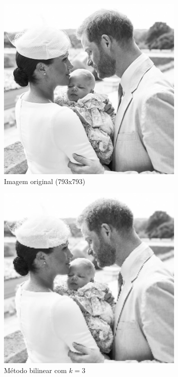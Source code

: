\documentclass[leqno]{article}
\begin{document}
\begin{figure}[H]
    \centering
    \begin{subfigure}{.33\textwidth}
      \centering
      \includegraphics[width=.7\linewidth]{../images/principe.png}
      \caption{Imagem original (793x793) }
      \label{fig:sub1}
    \end{subfigure}%
    \begin{subfigure}{.33\textwidth}
      \centering
      \includegraphics[width=.7\linewidth]{../images/principe_bil.png}
      \caption{Método bilinear com $k = 3$}
      \label{fig:sub2}
    \end{subfigure}
    \begin{subfigure}{.33\textwidth}
        \centering

\end{subfigure}
\end{figure}
\end{document}
